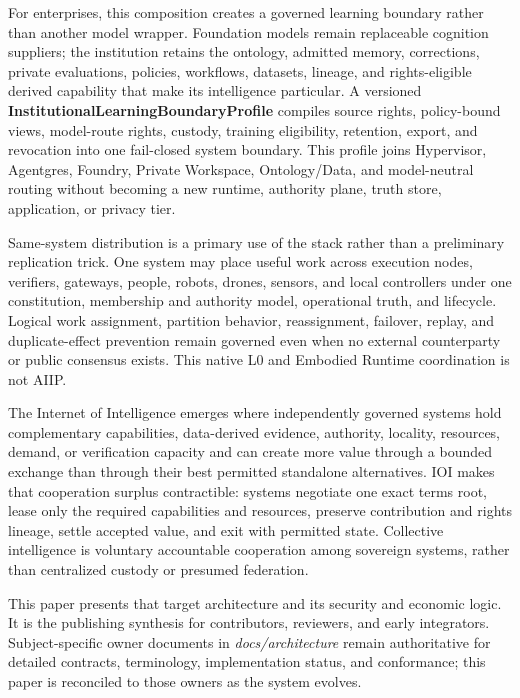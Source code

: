 \documentclass[
  11pt,
]{article}
\begin{document}
For enterprises, this composition creates a governed learning boundary rather
than another model wrapper. Foundation models remain replaceable cognition
suppliers; the institution retains the ontology, admitted memory, corrections,
private evaluations, policies, workflows, datasets, lineage, and rights-eligible
derived capability that make its intelligence particular. A versioned
\textbf{InstitutionalLearningBoundaryProfile} compiles source rights,
policy-bound views, model-route rights, custody, training eligibility,
retention, export, and revocation into one fail-closed system boundary. This
profile joins Hypervisor, Agentgres, Foundry, Private Workspace, Ontology/Data,
and model-neutral routing without becoming a new runtime, authority plane,
truth store, application, or privacy tier.

Same-system distribution is a primary use of the stack rather than a preliminary
replication trick. One system may place useful work across execution nodes,
verifiers, gateways, people, robots, drones, sensors, and local controllers under
one constitution, membership and authority model, operational truth, and
lifecycle. Logical work assignment, partition behavior, reassignment, failover,
replay, and duplicate-effect prevention remain governed even when no external
counterparty or public consensus exists. This native L0 and Embodied Runtime
coordination is not AIIP.

The Internet of Intelligence emerges where independently governed systems hold
complementary capabilities, data-derived evidence, authority, locality,
resources, demand, or verification capacity and can create more value through
a bounded exchange than through their best permitted standalone alternatives.
IOI makes that cooperation surplus contractible: systems negotiate one exact
terms root, lease only the required capabilities and resources, preserve
contribution and rights lineage, settle accepted value, and exit with permitted
state. Collective intelligence is voluntary accountable cooperation among
sovereign systems, rather than centralized custody or presumed federation.

This paper presents that target architecture and its security and economic
logic. It is the publishing synthesis for contributors, reviewers, and early
integrators. Subject-specific owner documents in \emph{docs/architecture}
remain authoritative for detailed contracts, terminology, implementation
status, and conformance; this paper is reconciled to those owners as the
system evolves.
\end{document}
